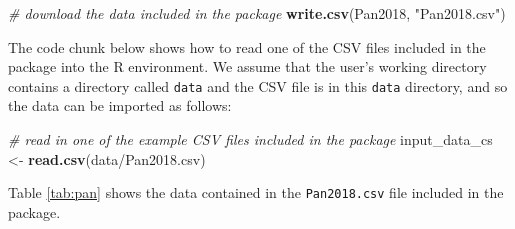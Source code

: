 \documentclass[]{elsarticle} %
\newenvironment{Shaded}{\begin{snugshade}}{\end{snugshade}}
\newcommand{\CommentTok}[1]{\textcolor[rgb]{0.56,0.35,0.01}{\textit{#1}}}
\newcommand{\KeywordTok}[1]{\textcolor[rgb]{0.13,0.29,0.53}{\textbf{#1}}}
\newcommand{\NormalTok}[1]{#1}
\newcommand{\StringTok}[1]{\textcolor[rgb]{0.31,0.60,0.02}{#1}}
\begin{document}
\begin{Shaded}
\begin{Highlighting}[]
\CommentTok{\# download the data included in the package}
\KeywordTok{write.csv}\NormalTok{(Pan2018, }\StringTok{"Pan2018.csv"}\NormalTok{)}
\end{Highlighting}
\end{Shaded}

The code chunk below shows how to read one of the CSV files included in the package into the R environment. We assume that the user's working directory contains a directory called \texttt{data} and the CSV file is in this \texttt{data} directory, and so the data can be imported as follows:

\begin{Shaded}
\begin{Highlighting}[]
\CommentTok{\# read in one of the example CSV files included in the package}
\NormalTok{input\_data\_cs \textless{}{-}}
\StringTok{  }\KeywordTok{read.csv}\NormalTok{(}\StringTok{\textquotesingle{}data/Pan2018.csv\textquotesingle{}}\NormalTok{)}
\end{Highlighting}
\end{Shaded}

Table \ref{tab:pan} shows the data contained in the \texttt{Pan2018.csv} file included in the package.
\end{document}
